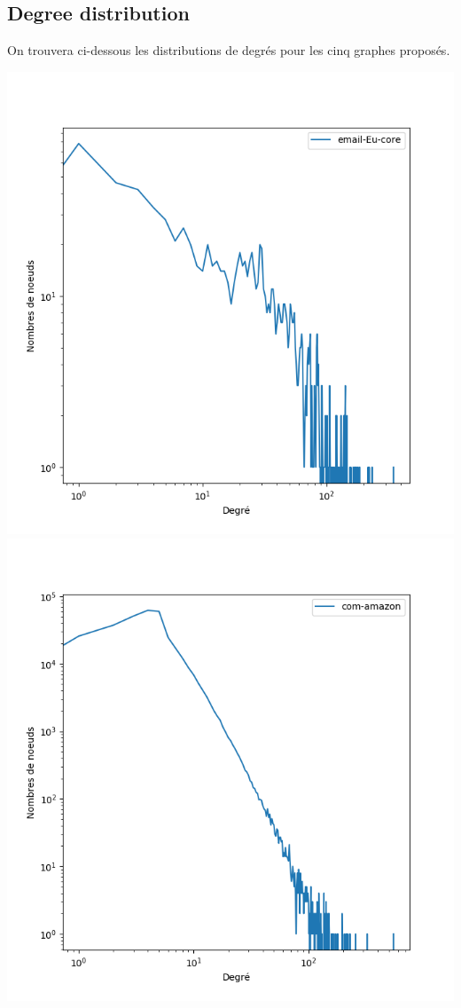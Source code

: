 \documentclass{report}
\begin{document}
\subsection*{Degree distribution}
On trouvera ci-dessous les distributions de degrés pour les cinq graphes proposés.
\begin{center}
  \includegraphics[height=.3\paperwidth]{assets/email-EU-core-dist.png}
  \includegraphics[height=.3\paperwidth]{assets/com-amazon-dist.png}

\end{center}
\end{document}
